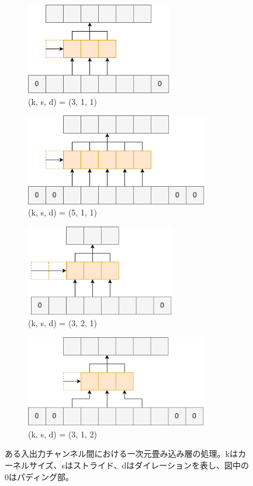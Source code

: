 \documentclass[12pt]{jarticle}
\numberwithin{equation}{section}    %
\numberwithin{figure}{section}      %
\numberwithin{table}{section}      %
\begin{document}
\begin{figure}[tb]
    \centering
    \begin{subfigure}[b]{0.48\textwidth}
        \centering
        \includegraphics[height=4cm]{./figure/sec3/conv1.drawio.png}
        \caption{(k, s, d) = (3, 1, 1)}
        \label{sec3:fig:conv1}
    \end{subfigure}
    \begin{subfigure}[b]{0.48\textwidth}
        \centering
        \includegraphics[height=4cm]{./figure/sec3/conv2.drawio.png}
        \caption{(k, s, d) = (5, 1, 1)}
        \label{sec3:fig:conv2}
    \end{subfigure}

    \vspace{0.5cm}

    \begin{subfigure}[b]{0.48\textwidth}
        \centering
        \includegraphics[height=4cm]{./figure/sec3/conv3.drawio.png}
        \caption{(k, s, d) = (3, 2, 1)}
        \label{sec3:fig:conv3}
    \end{subfigure}
    \begin{subfigure}[b]{0.48\textwidth}
        \centering
        \includegraphics[height=4cm]{./figure/sec3/conv4.drawio.png}
        \caption{(k, s, d) = (3, 1, 2)}
        \label{sec3:fig:conv4}
    \end{subfigure}
    \caption{ある入出力チャンネル間における一次元畳み込み層の処理。kはカーネルサイズ、sはストライド、dはダイレーションを表し、図中の0はパディング部。}
    \label{sec3:fig:conv_variations}
\end{figure}
\end{document}
